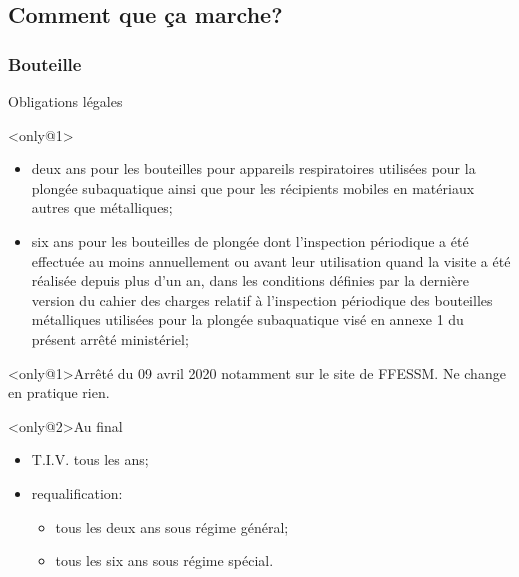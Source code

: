 \subsection{Comment que ça marche?}
\subsubsection{Bouteille}

\begin{frame}{Obligations légales}
\begin{block}<only@1>{}
\small
\begin{itemize}
\item deux ans pour les bouteilles pour appareils respiratoires utilisées pour la
  plongée subaquatique ainsi que pour les récipients mobiles en matériaux
  autres que métalliques;
\item six ans pour les bouteilles de plongée dont l'inspection périodique a été
  effectuée au moins annuellement ou avant leur utilisation quand la visite a
  été réalisée depuis plus d'un an, dans les conditions définies par la dernière
  version du cahier des charges relatif à l'inspection périodique des bouteilles
  métalliques utilisées pour la plongée subaquatique visé en annexe 1 du présent
  arrêté ministériel;
\end{itemize}
\end{block}%
\begin{block}<only@1>{Arrêté du 09 avril 2020}
notamment sur le site de FFESSM. Ne change en pratique rien.
\end{block}%
\begin{block}<only@2>{Au final}
\begin{itemize}
\item T.I.V. tous les ans;
\item requalification:
  \begin{itemize}
    \item tous les deux ans sous régime général;
    \item tous les six ans sous régime spécial.
  \end{itemize}
\end{itemize}
\end{block}
\end{frame}

